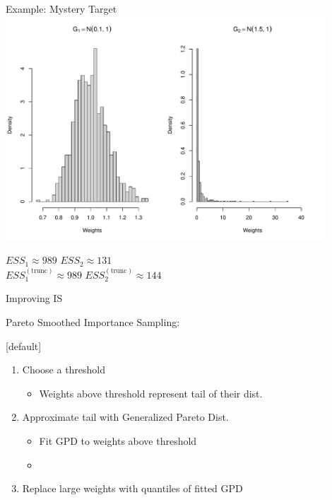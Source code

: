 \documentclass[14pt]{beamer}
\begin{document}

\begin{frame}{Example: Mystery Target}
    \centering
    \includegraphics[height=0.7\textheight, width=0.9\textwidth, keepaspectratio]{Figures/Wt Hist - Trunc.pdf} \newline
    \begin{outline}
        $ESS_1 \approx 989$ \hspace{2.5cm} $ESS_2 \approx 131$\\
        $ESS_1^{(\mathrm{trunc})} \approx 989$ \hspace{2.5cm} $ESS_2^{(\mathrm{trunc})} \approx 144$
    \end{outline}
\end{frame}


\begin{frame}{Improving IS}
    \begin{outline}
    \1 Pareto Smoothed Importance Sampling:
        \2 \citep{Veh22} \newline
    \end{outline}

    [default]
    \begin{enumerate}
    \item Choose a threshold
        \begin{itemize}
            \item Weights above threshold represent tail of their dist.
        \end{itemize}
    \item Approximate tail with Generalized Pareto Dist.
    \begin{itemize}
        \item Fit GPD to weights above threshold
        \item \citep{Zha09}
    \end{itemize}
    \item Replace large weights with quantiles of fitted GPD
    \end{enumerate}
\end{frame}
\end{document}
